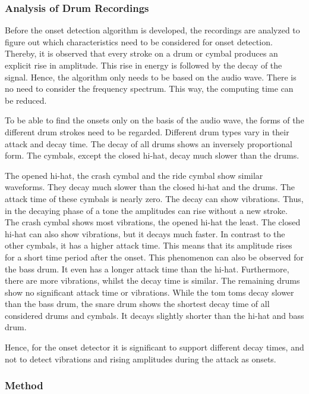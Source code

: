 \subsubsection{Analysis of Drum Recordings}

Before the onset detection algorithm is developed, the recordings are analyzed to figure out which characteristics need to be considered for onset detection. Thereby, it is observed that every stroke on a drum or cymbal produces an explicit rise in amplitude. This rise in energy is followed by the decay of the signal. Hence, the algorithm only needs to be based on the audio wave. There is no need to consider the frequency spectrum. This way, the computing time can be reduced. 

To be able to find the onsets only on the basis of the audio wave, the forms of the different drum strokes need to be regarded. Different drum types vary in their attack and decay time. The decay of all drums shows an inversely proportional form. The cymbals, except the closed hi-hat, decay much slower than the drums. 

The opened hi-hat, the crash cymbal and the ride cymbal show similar waveforms. They decay much slower than the closed hi-hat and the drums. The attack time of these cymbals is nearly zero. The decay can show vibrations. Thus, in the decaying phase of a tone the amplitudes can rise without a new stroke. The crash cymbal shows most vibrations, the opened hi-hat the least. The closed hi-hat can also show vibrations, but it decays much faster. In contrast to the other cymbals, it has a higher attack time. This means that its amplitude rises for a short time period after the onset. This phenomenon can also be observed for the bass drum. It even has a longer attack time than the hi-hat. Furthermore, there are more vibrations, whilst the decay time is similar. The remaining drums show no significant attack time or vibrations. While the tom toms decay slower than the bass drum, the snare drum shows the shortest decay time of all considered drums and cymbals. It decays slightly shorter than the hi-hat and bass drum. 

Hence, for the onset detector it is significant to support different decay times, and not to detect vibrations and rising amplitudes during the attack as onsets.

\newpage
\subsubsection{Method}

